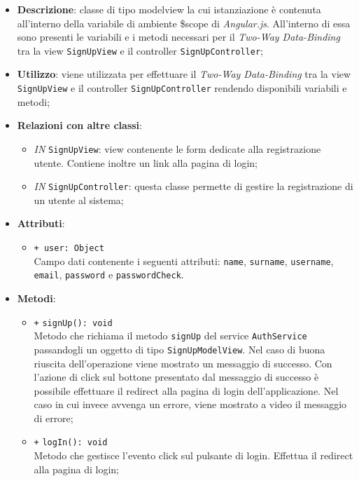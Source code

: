 	\begin{itemize}
		\item \textbf{Descrizione}: classe di tipo modelview la cui istanziazione è contenuta all'interno della variabile di ambiente \$scope di \textit{Angular.js}. All'interno di essa sono presenti le variabili e i metodi necessari per il \textit{Two-Way Data-Binding} tra la view \texttt{SignUpView} e il controller \texttt{SignUpController};
		\item \textbf{Utilizzo}: viene utilizzata per effettuare il \textit{Two-Way Data-Binding} tra la view \texttt{SignUpView} e il controller \texttt{SignUpController} rendendo disponibili variabili e metodi;
		\item \textbf{Relazioni con altre classi}: 
		\begin{itemize}
			\item \textit{IN} \texttt{SignUpView}: view contenente le form dedicate alla registrazione utente. Contiene inoltre un link alla pagina di login; 
			\item \textit{IN} \texttt{SignUpController}: questa classe permette di gestire la registrazione di un utente al sistema;
		\end{itemize}
		\item \textbf{Attributi}: 
		\begin{itemize}
			\item \texttt{+ user: Object} \\ Campo dati contenente i seguenti attributi: \texttt{name}, \texttt{surname}, \texttt{username}, \texttt{email}, \texttt{password} e \texttt{passwordCheck}.
		\end{itemize}
		\item \textbf{Metodi}: 
		\begin{itemize}
			\item \texttt{+} \texttt{signUp(): void} \\
			Metodo che richiama il metodo \texttt{signUp} del service \texttt{AuthService} passandogli un oggetto di tipo \texttt{SignUpModelView}. Nel caso di buona riuscita dell'operazione viene mostrato un messaggio di successo. Con l'azione di click sul bottone presentato dal messaggio di successo è possibile effettuare il redirect alla pagina di login dell'applicazione. Nel caso in cui invece avvenga un errore, viene mostrato a video il messaggio di errore;
			\item \texttt{+} \texttt{logIn(): void} \\
			Metodo che gestisce l’evento click sul pulsante di login. Effettua il redirect alla pagina di login;
		\end{itemize}
	\end{itemize}
	
